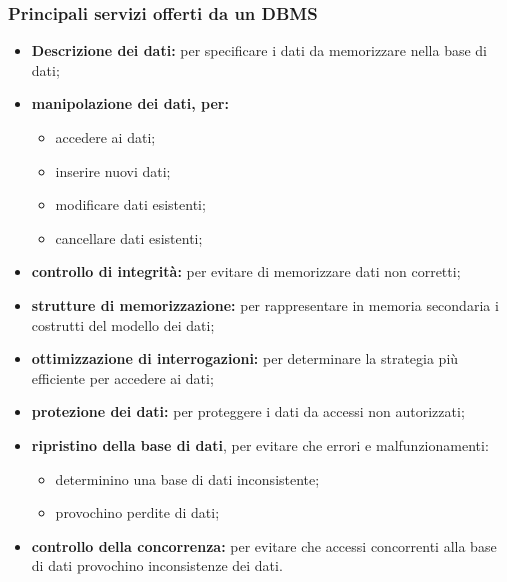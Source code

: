 \subsubsection{Principali servizi offerti da un DBMS}%
\label{ssub:Principali servizi offerti da un DBMS}
\begin{itemize}
  \item \textbf{Descrizione dei dati:} per specificare i dati da memorizzare
    nella base di dati;
  \item \textbf{manipolazione dei dati, per:}
    \begin{itemize}
      \item accedere ai dati;
      \item inserire nuovi dati;
      \item modificare dati esistenti;
      \item cancellare dati esistenti;
    \end{itemize}
  \item \textbf{controllo di integrità:} per evitare di memorizzare dati non
    corretti;
  \item \textbf{strutture di memorizzazione:} per rappresentare in memoria
    secondaria i costrutti del modello dei dati;
  \item \textbf{ottimizzazione di interrogazioni:} per determinare la strategia
    più efficiente per accedere ai dati;
  \item \textbf{protezione dei dati:} per proteggere i dati da accessi non
    autorizzati;
  \item \textbf{ripristino della base di dati}, per evitare che errori e
    malfunzionamenti:
    \begin{itemize}
      \item determinino una base di dati inconsistente;
      \item provochino perdite di dati;
    \end{itemize}
  \item \textbf{controllo della concorrenza:} per evitare che accessi
    concorrenti alla base di dati provochino inconsistenze dei dati.
\end{itemize}
